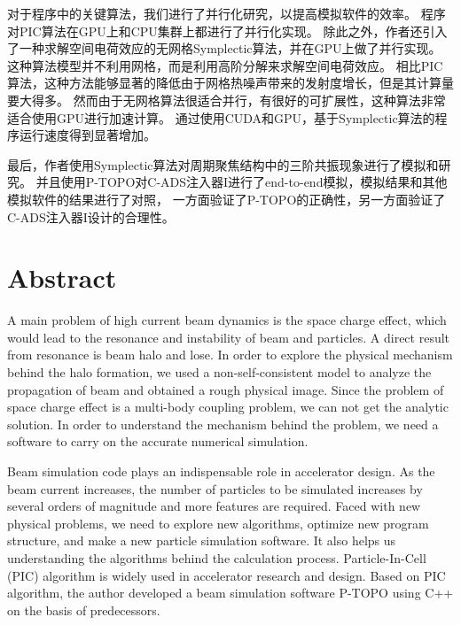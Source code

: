 对于程序中的关键算法，我们进行了并行化研究，以提高模拟软件的效率。
程序对PIC算法在GPU上和CPU集群上都进行了并行化实现。
除此之外，作者还引入了一种求解空间电荷效应的无网格Symplectic算法，并在GPU上做了并行实现。
这种算法模型并不利用网格，而是利用高阶分解来求解空间电荷效应。
相比PIC算法，这种方法能够显著的降低由于网格热噪声带来的发射度增长，但是其计算量要大得多。
然而由于无网格算法很适合并行，有很好的可扩展性，这种算法非常适合使用GPU进行加速计算。
通过使用CUDA和GPU，基于Symplectic算法的程序运行速度得到显著增加。

最后，作者使用Symplectic算法对周期聚焦结构中的三阶共振现象进行了模拟和研究。
并且使用P-TOPO对C-ADS注入器I进行了end-to-end模拟，模拟结果和其他模拟软件的结果进行了对照，
一方面验证了P-TOPO的正确性，另一方面验证了C-ADS注入器I设计的合理性。



\chapter{Abstract}%

A main problem of high current beam dynamics is the space charge effect, which would lead to the resonance and instability of beam and particles. 
A direct result from resonance is beam halo and lose.
In order to explore the physical mechanism behind the halo formation, we used a non-self-consistent model to analyze the propagation of beam and obtained a rough physical image.
Since the problem of space charge effect is a multi-body coupling problem, we can not get the analytic solution. 
In order to understand the mechanism behind the problem, we need a software to carry on the accurate numerical simulation.

Beam simulation code plays an indispensable role in accelerator design.
As the beam current increases, the number of particles to be simulated increases by several orders of magnitude
and more features are required.
Faced with new physical problems, we need to explore new algorithms, optimize new program structure, and make a new particle simulation software.
It also helps us understanding the algorithms behind the calculation process.
Particle-In-Cell (PIC) algorithm is widely used in accelerator research and design.
Based on PIC algorithm, the author developed a beam simulation software P-TOPO using C++ on the basis of predecessors.


